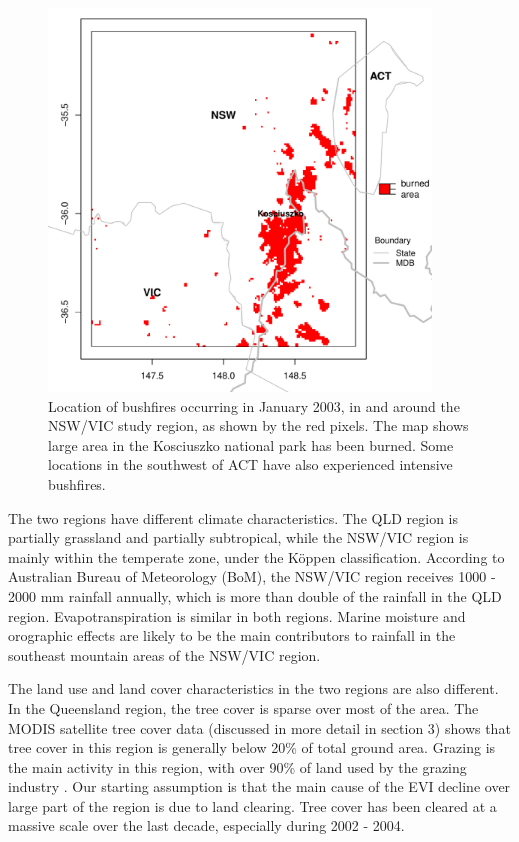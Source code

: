 \documentclass[onecolumn,referee]{svjour3}
\begin{document}
\begin{figure}[ht!]
  \centerline{\includegraphics[height=4in, clip, scale=0.6]{bushfire_nswvic.pdf}}
  \caption{Location of bushfires occurring in January 2003, in and around the NSW/VIC study region, as shown by the red pixels. The map shows large area in the Kosciuszko national park has been burned. Some locations in the southwest of ACT have also experienced intensive bushfires.}
  \label{fig:bushfire}
\end{figure}

The two regions have different climate characteristics. The QLD region is partially grassland and partially subtropical, while the NSW/VIC region is mainly within the temperate zone, under the K\"{o}ppen classification. According to Australian Bureau of Meteorology (BoM), the NSW/VIC region receives 1000 - 2000 mm rainfall annually, which is more than double of the rainfall in the QLD region. Evapotranspiration is similar in both regions. Marine moisture and orographic effects are likely to be the main contributors to rainfall in the southeast mountain areas of the NSW/VIC region. 

The land use and land cover characteristics in the two regions are also different. In the Queensland region, the tree cover is sparse over most of the area. The MODIS satellite tree cover data (discussed in more detail in section 3) shows that tree cover in this region is generally below 20\% of total ground area. Grazing is the main activity in this region, with over 90\% of land used by the grazing industry \citep{ABARES2010}. Our starting assumption is that the main cause of the EVI  decline over large part of the region is due to land clearing. Tree cover has been cleared at a massive scale over the last decade, especially during 2002 - 2004.  
\end{document}
